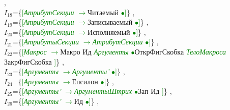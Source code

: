 \documentclass[a0]{a0poster}
\begin{document}
,\\
$I_{18}$=\{\textcolor{Green}{[}\textcolor{Green}{\textit{АтрибутСекции}} \textcolor{Green}{$\to$}Читаемый \textcolor{Green}{$\bullet$}\textcolor{Green}{]}\}
,\\
$I_{19}$=\{\textcolor{Green}{[}\textcolor{Green}{\textit{АтрибутСекции}} \textcolor{Green}{$\to$}Записываемый \textcolor{Green}{$\bullet$}\textcolor{Green}{]}\}
,\\
$I_{20}$=\{\textcolor{Green}{[}\textcolor{Green}{\textit{АтрибутСекции}} \textcolor{Green}{$\to$}Исполняемый \textcolor{Green}{$\bullet$}\textcolor{Green}{]}\}
,\\
$I_{21}$=\{\textcolor{Green}{[}\textcolor{Green}{\textit{АтрибутыСекции}} \textcolor{Green}{$\to$}\textcolor{Green}{\textit{АтрибутСекции}} \textcolor{Green}{$\bullet$}\textcolor{Green}{]}\}
,\\
$I_{22}$=\{\textcolor{Green}{[}\textcolor{Green}{\textit{Макрос}} \textcolor{Green}{$\to$}Макро Ид \textcolor{Green}{\textit{Аргументы}} \textcolor{Green}{$\bullet$}ОткрФигСкобка \textcolor{Green}{\textit{ТелоМакроса}} ЗакрФигСкобка \textcolor{Green}{]}\}
,\\
$I_{23}$=\{\textcolor{Green}{[}\textcolor{Green}{\textit{Аргументы}} \textcolor{Green}{$\to$}\textcolor{Green}{\textit{Аргументы'}} \textcolor{Green}{$\bullet$}\textcolor{Green}{]}\}
,\\
$I_{24}$=\{\textcolor{Green}{[}\textcolor{Green}{\textit{Аргументы}} \textcolor{Green}{$\to$}Епсилон \textcolor{Green}{$\bullet$}\textcolor{Green}{]}\}
,\\
$I_{25}$=\{\textcolor{Green}{[}\textcolor{Green}{\textit{Аргументы'}} \textcolor{Green}{$\to$}\textcolor{Green}{\textit{АргументыШтрих}} \textcolor{Green}{$\bullet$}Зап Ид \textcolor{Green}{]}\}
,\\
$I_{26}$=\{\textcolor{Green}{[}\textcolor{Green}{\textit{Аргументы'}} \textcolor{Green}{$\to$}Ид \textcolor{Green}{$\bullet$}\textcolor{Green}{]}\}
,\\
\end{document}
